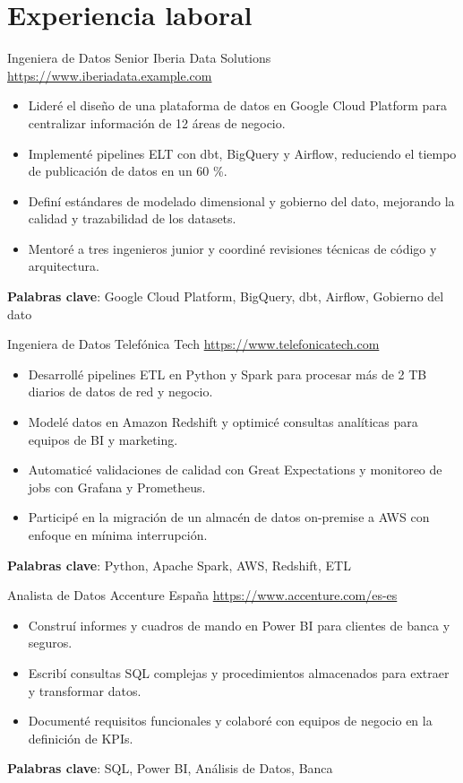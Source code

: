 \documentclass[a4paper, serif, 10pt]{moderncv}
\begin{document}
\section{Experiencia laboral}

        {Ingeniera de Datos Senior}
        {Iberia Data Solutions}
        {\url{https://www.iberiadata.example.com}}
        {}
        {\begin{itemize}
\item Lideré el diseño de una plataforma de datos en Google Cloud Platform para centralizar información de 12 áreas de negocio.
\item Implementé pipelines ELT con dbt, BigQuery y Airflow, reduciendo el tiempo de publicación de datos en un 60 \%.
\item Definí estándares de modelado dimensional y gobierno del dato, mejorando la calidad y trazabilidad de los datasets.
\item Mentoré a tres ingenieros junior y coordiné revisiones técnicas de código y arquitectura.
\end{itemize}
\textbf{Palabras clave}: Google Cloud Platform, BigQuery, dbt, Airflow, Gobierno del dato}

        {Ingeniera de Datos}
        {Telefónica Tech}
        {\url{https://www.telefonicatech.com}}
        {}
        {\begin{itemize}
\item Desarrollé pipelines ETL en Python y Spark para procesar más de 2 TB diarios de datos de red y negocio.
\item Modelé datos en Amazon Redshift y optimicé consultas analíticas para equipos de BI y marketing.
\item Automaticé validaciones de calidad con Great Expectations y monitoreo de jobs con Grafana y Prometheus.
\item Participé en la migración de un almacén de datos on-premise a AWS con enfoque en mínima interrupción.
\end{itemize}
\textbf{Palabras clave}: Python, Apache Spark, AWS, Redshift, ETL}

        {Analista de Datos}
        {Accenture España}
        {\url{https://www.accenture.com/es-es}}
        {}
        {\begin{itemize}
\item Construí informes y cuadros de mando en Power BI para clientes de banca y seguros.
\item Escribí consultas SQL complejas y procedimientos almacenados para extraer y transformar datos.
\item Documenté requisitos funcionales y colaboré con equipos de negocio en la definición de KPIs.
\end{itemize}
\textbf{Palabras clave}: SQL, Power BI, Análisis de Datos, Banca}
\end{document}
